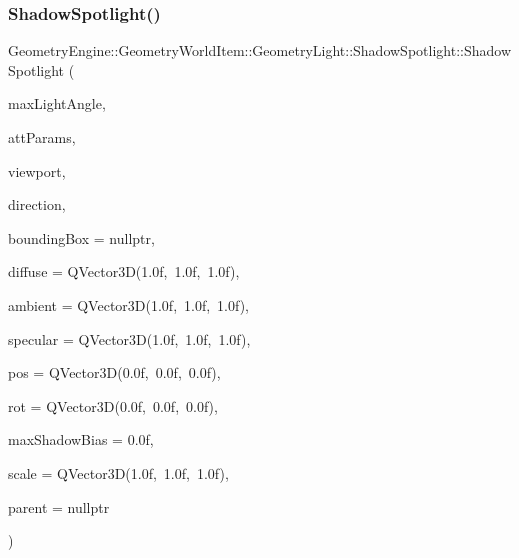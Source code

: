 \subsubsection{\texorpdfstring{ShadowSpotlight()}{ShadowSpotlight()}\hspace{0.1cm}{\footnotesize\ttfamily [1/2]}}
{\footnotesize\ttfamily Geometry\+Engine\+::\+Geometry\+World\+Item\+::\+Geometry\+Light\+::\+Shadow\+Spotlight\+::\+Shadow\+Spotlight (\begin{DoxyParamCaption}\item[{float}]{max\+Light\+Angle,  }\item[{const Q\+Vector3D \&}]{att\+Params,  }\item[{const \mbox{\hyperlink{class_geometry_engine_1_1_geometry_item_utils_1_1_viewport}{Geometry\+Item\+Utils\+::\+Viewport}} \&}]{viewport,  }\item[{const Q\+Vector3D \&}]{direction,  }\item[{\mbox{\hyperlink{class_geometry_engine_1_1_geometry_world_item_1_1_geometry_item_1_1_geometry_item}{Geometry\+Item\+::\+Geometry\+Item}} $\ast$}]{bounding\+Box = {\ttfamily nullptr},  }\item[{const Q\+Vector3D \&}]{diffuse = {\ttfamily QVector3D(1.0f,~1.0f,~1.0f)},  }\item[{const Q\+Vector3D \&}]{ambient = {\ttfamily QVector3D(1.0f,~1.0f,~1.0f)},  }\item[{const Q\+Vector3D \&}]{specular = {\ttfamily QVector3D(1.0f,~1.0f,~1.0f)},  }\item[{const Q\+Vector3D \&}]{pos = {\ttfamily QVector3D(0.0f,~0.0f,~0.0f)},  }\item[{const Q\+Vector3D \&}]{rot = {\ttfamily QVector3D(0.0f,~0.0f,~0.0f)},  }\item[{float}]{max\+Shadow\+Bias = {\ttfamily 0.0f},  }\item[{const Q\+Vector3D \&}]{scale = {\ttfamily QVector3D(1.0f,~1.0f,~1.0f)},  }\item[{\mbox{\hyperlink{class_geometry_engine_1_1_geometry_world_item_1_1_world_item}{World\+Item}} $\ast$}]{parent = {\ttfamily nullptr} }\end{DoxyParamCaption})}

